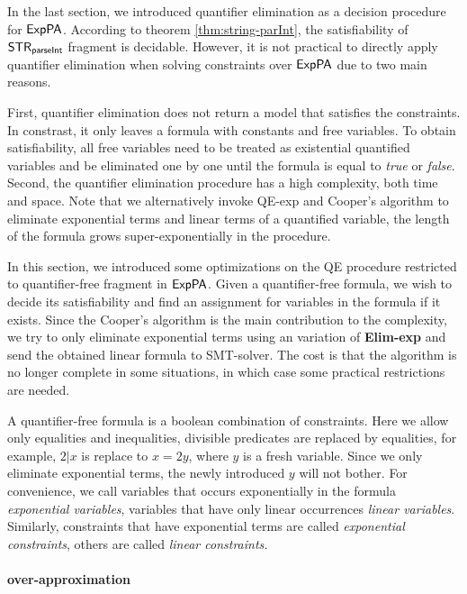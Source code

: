 
In the last section, 
we introduced quantifier elimination as a decision procedure for {${\sf ExpPA}$}. According to theorem \ref{thm:string-parInt}, the satisfiability of {${\sf STR}_{\textsf{parseInt}}$} fragment is decidable.
However, it is not practical to directly apply quantifier elimination when solving constraints over {${\sf ExpPA}$} due to two main reasons.

First, quantifier elimination does not return a model that satisfies the constraints. In constrast, it only leaves a formula with constants and free variables. To obtain satisfiability, all free variables need to be treated as existential quantified variables and be eliminated one by one until the formula is equal to \textit{true} or \textit{false}.
Second, the quantifier elimination procedure has a high complexity, both time and space. Note that we alternatively invoke QE-exp and Cooper's algorithm to eliminate exponential terms and linear terms of a quantified variable, the length of the formula grows super-exponentially in the procedure. 

In this section, we introduced some optimizations on the QE procedure restricted to quantifier-free fragment in {${\sf ExpPA}$}. Given a quantifier-free formula, we wish to decide its satisfiability and find an assignment for variables in the formula if it exists. Since the Cooper's algorithm is the main contribution to the complexity, we try to only eliminate exponential terms using an variation of \textbf{Elim-exp} and send the obtained linear formula to SMT-solver. The cost is that the algorithm is no longer complete in some situations, in which case some practical restrictions are needed.

A quantifier-free formula is a boolean combination of constraints. Here we allow only equalities and inequalities, divisible predicates are replaced by equalities, for example, $2|x$ is replace to $x=2y$, where $y$ is a fresh variable. Since we only eliminate exponential terms, the newly introduced $y$ will not bother. For convenience, we call variables that occurs exponentially in the formula \emph{exponential variables}, variables that have only linear occurrences \emph{linear variables}. Similarly,
constraints that have exponential terms are called \textit{exponential constraints}, others are called \textit{linear constraints.}

\paragraph{over-approximation}

